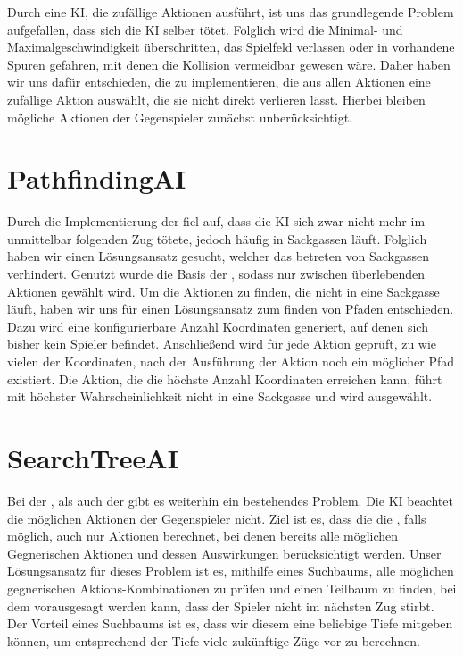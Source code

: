 Durch eine \acs{KI}, die zufällige Aktionen ausführt, ist uns das grundlegende Problem aufgefallen, dass
sich die \acs{KI} selber tötet.
Folglich wird die Minimal- und Maximalgeschwindigkeit überschritten, das Spielfeld verlassen oder
in vorhandene Spuren gefahren, mit denen die Kollision vermeidbar gewesen wäre.
Daher haben wir uns dafür entschieden, die  zu implementieren, die aus allen
Aktionen eine zufällige Aktion auswählt, die sie nicht direkt verlieren lässt. 
Hierbei bleiben mögliche Aktionen der Gegenspieler zunächst unberücksichtigt.\\

\section{PathfindingAI}
\label{sec:pathfinding-ai}

Durch die Implementierung der  fiel auf, dass die \acs{KI} sich zwar nicht mehr im
unmittelbar folgenden Zug tötete, jedoch häufig in Sackgassen läuft.
Folglich haben wir einen Lösungsansatz gesucht, welcher das betreten von Sackgassen verhindert.
Genutzt wurde die Basis der , sodass nur zwischen überlebenden Aktionen gewählt wird.
Um die Aktionen zu finden, die nicht in eine Sackgasse läuft, haben wir uns für einen Lösungsansatz zum 
finden von Pfaden entschieden.
Dazu wird eine konfigurierbare Anzahl Koordinaten generiert, auf denen sich bisher kein Spieler befindet.
Anschließend wird für jede Aktion geprüft, zu wie vielen der Koordinaten, nach der Ausführung der 
Aktion noch ein möglicher Pfad existiert. 
Die Aktion, die die höchste Anzahl Koordinaten erreichen kann, führt mit höchster Wahrscheinlichkeit
nicht in eine Sackgasse und wird ausgewählt.

\section{SearchTreeAI}
\label{sec:searchtree-ai}

Bei der , als auch der  gibt es weiterhin ein  bestehendes 
Problem. Die \acs{KI} beachtet die möglichen Aktionen der Gegenspieler nicht.
Ziel ist es, dass die die , falls möglich, auch nur Aktionen berechnet,
bei denen bereits alle möglichen Gegnerischen Aktionen und dessen Auswirkungen berücksichtigt werden.
Unser Lösungsansatz für dieses Problem ist es, mithilfe eines Suchbaums, alle möglichen gegnerischen 
Aktions-Kombinationen zu prüfen und einen Teilbaum zu finden, bei dem vorausgesagt werden kann, dass
der Spieler nicht im nächsten Zug stirbt. Der Vorteil eines Suchbaums ist es, dass wir diesem eine
beliebige Tiefe mitgeben können, um entsprechend der Tiefe viele zukünftige Züge vor zu berechnen. 
